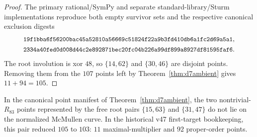 \begin{proof}
The primary rational/SymPy and separate standard-library/Sturm implementations
reproduce both empty survivor sets and the respective canonical exclusion
digests
\[
\begin{gathered}
\digest{19f1bba6f56200bac45a52810a56669c}{51824f22a9b3fd410db6a1fc2d69a5a1},\\
\digest{2334a40fed0d008d44c2e892871bec20}{fc04b226a99df899a8927df81595faf6}.
\end{gathered}
\]
The root involution is xor $48$, so $\{14,62\}$ and $\{30,46\}$ are disjoint
points.  Removing them from the $107$ points left by
Theorem~\ref{thm:d7ambient} gives $11+94=105$.
\end{proof}


\begin{proposition}[Two further proper-order $d=7$ exclusions]\label{prop:d7mask15_31}
In the canonical point manifest of Theorem~\ref{thm:d7ambient}, the
two nontrivial-$R_{83}$ points represented by the free root pairs
$\{15,63\}$ and $\{31,47\}$ do not lie on the normalized McMullen curve.
In the historical v47 first-target bookkeeping, this pair reduced $105$ to $103$:
$11$ maximal-multiplier and $92$ proper-order points.
\end{proposition}
